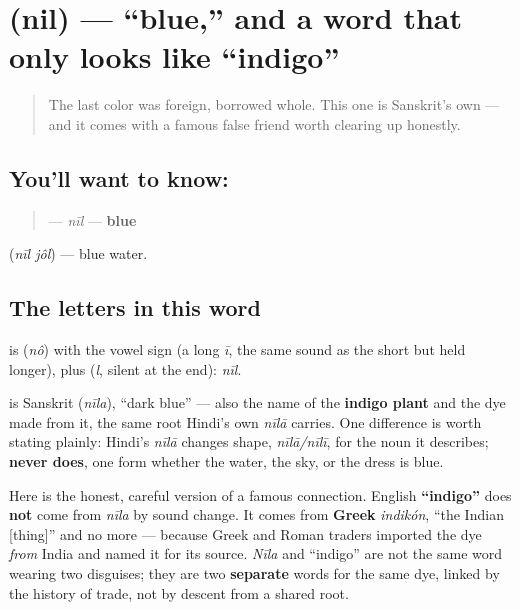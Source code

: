 \section[\texorpdfstring{\bn{নীল} (nil)}{নীল (nil)}]{ (nil) — \textquotedblleft{}blue,\textquotedblright{} and a word that only looks like \textquotedblleft{}indigo\textquotedblright{}}

\label{lesson:BN-C14-nil}



\begin{quote}
The last color was foreign, borrowed whole. This one is Sanskrit's own — and it comes with a famous false friend worth clearing up honestly.
\end{quote}

\subsection*{You'll want to know: }
\begin{quote}
\textbf{} — \emph{nīl} — \textbf{blue}
\end{quote}

  (\emph{nīl jôl}) — blue water.

\subsection*{The letters in this word}
\textbf{} is \textbf{} (\emph{nô}) with the vowel sign \textbf{} (a long \emph{ī}, the same sound as the short \emph{} but held longer), plus \textbf{} (\emph{l}, silent at the end): \emph{nīl}.

\begin{cousinweb}
\textbf{} is Sanskrit \textbf{} (\emph{nīla}), \textquotedblleft{}dark blue\textquotedblright{} — also the name of the \textbf{indigo plant} and the dye made from it, the same root Hindi's own \emph{nīlā} carries. One difference is worth stating plainly: Hindi's \emph{nīlā} changes shape, \emph{nīlā/nīlī}, for the noun it describes; \textbf{ never does}, one form whether the water, the sky, or the dress is blue.

Here is the honest, careful version of a famous connection. English \textbf{\textquotedblleft{}indigo\textquotedblright{}} does \textbf{not} come from \emph{nīla} by sound change. It comes from \textbf{Greek} \emph{indikón}, \textquotedblleft{}the Indian {[}thing{]}\textquotedblright{} and no more — because Greek and Roman traders imported the dye \emph{from} India and named it for its source. \emph{Nīla} and \textquotedblleft{}indigo\textquotedblright{} are not the same word wearing two disguises; they are two \textbf{separate} words for the same dye, linked by the history of trade, not by descent from a shared root.
\end{cousinweb}


